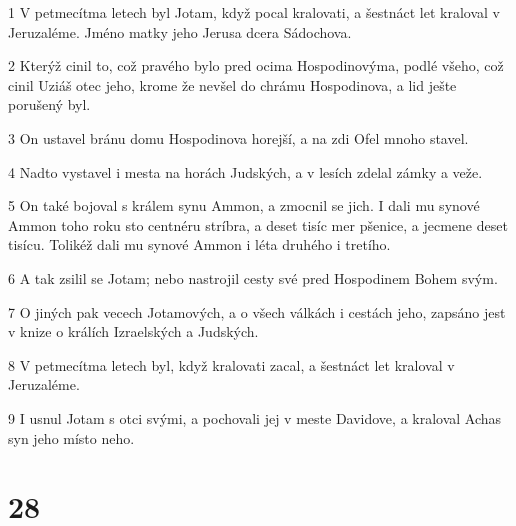 \par 1 V petmecítma letech byl Jotam, když pocal kralovati, a šestnáct let kraloval v Jeruzaléme. Jméno matky jeho Jerusa dcera Sádochova.
\par 2 Kterýž cinil to, což pravého bylo pred ocima Hospodinovýma, podlé všeho, což cinil Uziáš otec jeho, krome že nevšel do chrámu Hospodinova, a lid ješte porušený byl.
\par 3 On ustavel bránu domu Hospodinova horejší, a na zdi Ofel mnoho stavel.
\par 4 Nadto vystavel i mesta na horách Judských, a v lesích zdelal zámky a veže.
\par 5 On také bojoval s králem synu Ammon, a zmocnil se jich. I dali mu synové Ammon toho roku sto centnéru stríbra, a deset tisíc mer pšenice, a jecmene deset tisícu. Tolikéž dali mu synové Ammon i léta druhého i tretího.
\par 6 A tak zsilil se Jotam; nebo nastrojil cesty své pred Hospodinem Bohem svým.
\par 7 O jiných pak vecech Jotamových, a o všech válkách i cestách jeho, zapsáno jest v knize o králích Izraelských a Judských.
\par 8 V petmecítma letech byl, když kralovati zacal, a šestnáct let kraloval v Jeruzaléme.
\par 9 I usnul Jotam s otci svými, a pochovali jej v meste Davidove, a kraloval Achas syn jeho místo neho.

\chapter{28}

